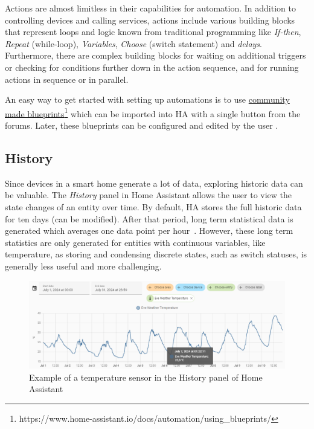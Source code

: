 Actions are almost limitless in their capabilities for automation. In addition to controlling devices and calling services, actions include various building blocks that represent loops and logic known from traditional programming like \textit{If-then}, \textit{Repeat} (while-loop), \textit{Variables}, \textit{Choose} (switch statement) and \textit{delays}. Furthermore, there are complex building blocks for waiting on additional triggers or checking for conditions further down in the action sequence, and for running actions in sequence or in parallel. 

An easy way to get started with setting up automations is to use \href{https://www.home-assistant.io/docs/automation/using_blueprints/}{community made blueprints}\footnote{https://www.home-assistant.io/docs/automation/using\_blueprints/} which can be imported into HA with a single button from the forums. Later, these blueprints can be configured and edited by the user \cite{HomeAssistant_Automation_Blueprints}.

\subsection{History}
Since devices in a smart home generate a lot of data, exploring historic data can be valuable. The \textit{History} panel in Home Assistant allows the user to view the state changes of an entity over time. By default, HA stores the full historic data for ten days (can be modified). After that period, long term statistical data is generated which averages one data point per hour~\cite{HomeAssistant_History}. However, these long term statistics are only generated for entities with continuous variables, like temperature, as storing and condensing discrete states, such as switch statuses, is generally less useful and more challenging.

\begin{figure}[H]
    \centering
    \includegraphics[width=.95\linewidth]{img/ha-history.png}
    \caption{Example of a temperature sensor in the History panel of Home Assistant}
    \label{fig:HA-History}
\end{figure}

